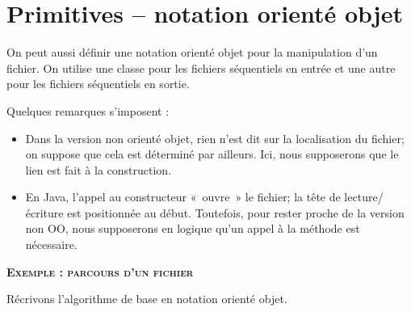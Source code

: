 \section{Primitives – notation orienté objet}

On peut aussi définir une notation orienté objet pour la manipulation
d'un fichier. On utilise une classe pour les fichiers
séquentiels en entrée et une autre pour les fichiers séquentiels en
sortie.


\bigskip



Quelques remarques s'imposent :

\liststyleListv
\begin{itemize}
	\item 
		Dans la version non orienté objet, rien n'est dit sur
		la localisation du fichier; on suppose que cela est déterminé par
		ailleurs. Ici, nous supposerons que le lien est fait à la
		construction.
	\item 
		En Java, l'appel au constructeur «~ouvre~» le fichier;
		la tête de lecture/écriture est positionnée au début. Toutefois, pour
		rester proche de la version non OO, nous supposerons en logique
		qu'un appel à la méthode 
		est nécessaire.
\end{itemize}

{\sffamily\bfseries\scshape
Exemple : parcours d'un fichier}

Récrivons l'algorithme de base en notation orienté
objet.


